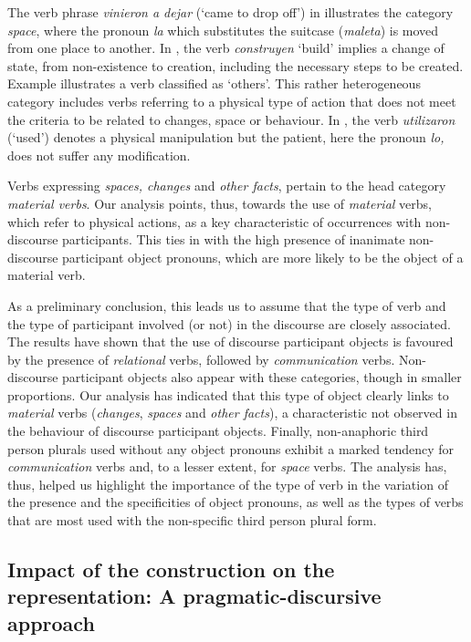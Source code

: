 \documentclass[output=paper]{langscibook}
\begin{document}
The verb phrase \textit{vinieron a dejar} (‘came to drop off’) in  illustrates the category \textit{space}, where the pronoun \textit{la} which substitutes the suitcase (\textit{maleta}) is moved from one place to another. In , the verb \textit{construyen} ‘build’ implies a change of state, from non-existence to creation, including the necessary steps to be created. Example  illustrates a verb classified as ‘others’. This rather heterogeneous category includes verbs referring to a physical type of action that does not meet the criteria to be related to changes, space or behaviour. In , the verb \textit{utilizaron} (‘used') denotes a physical manipulation but the patient, here the pronoun \textit{lo,} does not suffer any modification. 


Verbs expressing \textit{spaces, changes} and \textit{other facts}, pertain to the head category \textit{material verbs}. Our analysis points, thus, towards the use of \textit{material} verbs, which refer to physical actions, as a key characteristic of occurrences with non-dis\-course participants. This ties in with the high presence of inanimate non-dis\-course participant object pronouns, which are more likely to be the object of a material verb.


As a preliminary conclusion, this leads us to assume that the type of verb and the type of participant involved (or not) in the discourse are closely associated. The results have shown that the use of discourse participant objects is favoured by the presence of \textit{relational} verbs, followed by \textit{communication} verbs. Non-discourse participant objects also appear with these categories, though in smaller proportions. Our analysis has indicated that this type of object clearly links to \textit{material} verbs (\textit{changes}, \textit{spaces} and \textit{other facts}), a characteristic not observed in the behaviour of discourse participant objects. Finally, non-anaphoric third person plurals used without any object pronouns exhibit a marked tendency for \textit{communication} verbs and, to a lesser extent, for \textit{space} verbs. The analysis has, thus, helped us highlight the importance of the type of verb in the variation of the presence and the specificities of object pronouns, as well as the types of verbs that are most used with the non-specific third person plural form.



\subsection{Impact of the construction on the representation: A pragmatic-discursive approach}\label{sec:pierre:4.2}
\end{document}
